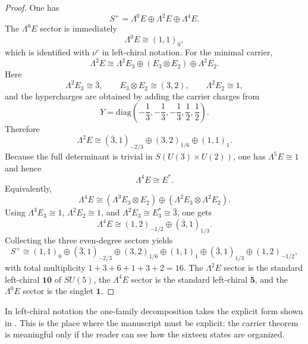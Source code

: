 \documentclass[11pt,a4paper]{article}
\theoremstyle{definition}
\theoremstyle{remark}
\begin{document}
\begin{proof}
One has
\[
S^+=\Lambda^0E\oplus\Lambda^2E\oplus\Lambda^4E.
\]
The $\Lambda^0E$ sector is immediately
\[
\Lambda^0E\cong (1,1)_0,
\]
which is identified with $\nu^c$ in left-chiral notation. For the minimal carrier,
\[
\Lambda^2E
\cong
\Lambda^2E_3\oplus(E_3\otimes E_2)\oplus\Lambda^2E_2.
\]
Here
\[
\Lambda^2E_3\cong \bar 3,
\qquad
E_3\otimes E_2\cong (3,2),
\qquad
\Lambda^2E_2\cong 1,
\]
and the hypercharges are obtained by adding the carrier charges from
\[
Y=\mathrm{diag}\!\left(-\frac13,-\frac13,-\frac13,\frac12,\frac12\right).
\]
Therefore
\[
\Lambda^2E
\cong
(\bar 3,1)_{-2/3}\oplus(3,2)_{1/6}\oplus(1,1)_1.
\]
Because the full determinant is trivial in $S(U(3)\times U(2))$, one has $\Lambda^5E\cong 1$ and hence
\[
\Lambda^4E\cong E^\ast.
\]
Equivalently,
\[
\Lambda^4E
\cong
(\Lambda^3E_3\otimes E_2)\oplus(\Lambda^2E_3\otimes\Lambda^2E_2).
\]
Using $\Lambda^3E_3\cong 1$, $\Lambda^2E_2\cong 1$, and $\Lambda^2E_3\cong E_3^\ast\cong\bar 3$, one gets
\[
\Lambda^4E\cong (1,2)_{-1/2}\oplus(\bar 3,1)_{1/3}.
\]
Collecting the three even-degree sectors yields
\[
S^+
\cong
(1,1)_0\oplus(\bar 3,1)_{-2/3}\oplus(3,2)_{1/6}\oplus(1,1)_1\oplus(\bar 3,1)_{1/3}\oplus(1,2)_{-1/2},
\]
with total multiplicity $1+3+6+1+3+2=16$. The $\Lambda^2E$ sector is the standard left-chiral $\mathbf{10}$ of $SU(5)$, the $\Lambda^4E$ sector is the standard left-chiral $\overline{\mathbf 5}$, and the $\Lambda^0E$ sector is the singlet $\mathbf 1$.
\end{proof}

In left-chiral notation the one-family decomposition takes the explicit form shown in . This is the place where the manuscript must be explicit: the carrier theorem is meaningful only if the reader can see how the sixteen states are organized.
\end{document}
